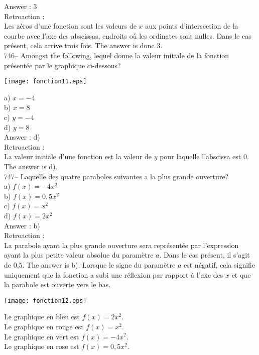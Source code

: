 ﻿\documentclass[letterpaper, 12pt]{article}
\begin{document}
Answer : 3\\

Retroaction : \\
Les z\'eros d'une fonction sont les valeurs de $x$ aux points d'intersection
de la courbe avec l'axe des abscissas, endroits o\`u les ordinates sont
nulles.  Dans le cas pr\'esent, cela arrive trois fois.  The answer is
donc 3.\\

746-- Amongst the following, lequel donne la valeur initiale de la
fonction pr\'esent\'ee par le graphique ci-dessous?\\
    \begin{center}
    \texttt{[image: fonction11.eps]}
    \end{center}
a) $x=-4$\\
b) $x=8$\\
c) $y=-4$\\
d) $y=8$\\

Answer : d)\\

Retroaction : \\
La valeur initiale d'une fonction est la valeur de $y$ pour laquelle
l'abscissa est 0.  The answer is d).\\

747-- Laquelle des quatre paraboles suivantes a la plus grande ouverture?\\
a) $f(x)=-4x^{2}$\\
b) $f(x)=0,5x^{2}$\\
c) $f(x)=x^{2}$\\
d) $f(x)=2x^{2}$\\

Answer : b)\\

Retroaction : \\
La parabole ayant la plus grande ouverture sera repr\'esent\'ee par
l'expression ayant la plus petite valeur absolue du param\`etre $a$. Dans le
cas pr\'esent, il s'agit de 0,5. The answer is b). Lorsque le signe
du param\`etre $a$ est n\'egatif, cela signifie uniquement que la fonction a
subi une r\'eflexion par rapport \`a l'axe des $x$ et que la parabole est
ouverte vers le bas.\\
    \begin{center}
    \texttt{[image: fonction12.eps]}
    \end{center}
Le graphique en bleu est $f(x)=2x^{2}$.\\
Le graphique en rouge est $f(x)=x^{2}$.\\
Le graphique en vert est $f(x)=-4x^{2}$.\\
Le graphique en rose est $f(x)=0,5x^{2}$.\\
\end{document}

